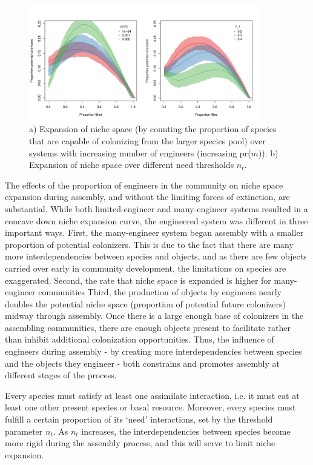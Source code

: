 \documentclass[twocolumn,preprintnumbers,amsmath,amssymb,superscriptaddress]{revtex4}
\begin{document}
\begin{figure}[ht]
\centering
\includegraphics[width=0.9\textwidth]{fig_potcol_comb.pdf}
\caption{
a) Expansion of niche space (by counting the proportion of species that are capable of colonizing from the larger species pool) over systems with increasing number of engineers (increasing pr($m$)). b) Expansion of niche space over different need thresholds $n_t$. 
}
\label{fig_potcol}
\end{figure} 

The effects of the proportion of engineers in the community on niche space expansion during assembly, and without the limiting forces of extinction, are substantial.
While both limited-engineer and many-engineer systems resulted in a concave down niche expansion curve, the engineered system was different in three important ways.
First, the many-engineer system began assembly with a smaller proportion of potential colonizers.
This is due to the fact that there are many more interdependencies between species and objects, and as there are few objects carried over early in community development, the limitations on species are exaggerated.
Second, the rate that niche space is expanded is higher for many-engineer communities
Third, the production of objects by engineers nearly doubles the potential niche space (proportion of potential future colonizers) midway through assembly.
Once there is a large enough base of colonizers in the assembling communities, there are enough objects present to facilitate rather than inhibit additional colonization opportunities.
Thus, the influence of engineers during assembly - by creating more interdependencies between species and the objects they engineer - both constrains and promotes assembly at different stages of the process.


Every species must satisfy at least one assimilate interaction, i.e. it must eat at least one other present species or basal resource.
Moreover, every species must fulfill a certain proportion of its `need' interactions, set by the threshold parameter $n_t$.
As $n_t$ increases, the interdependencies between species become more rigid during the assembly process, and this will serve to limit niche expansion.
\end{document}
